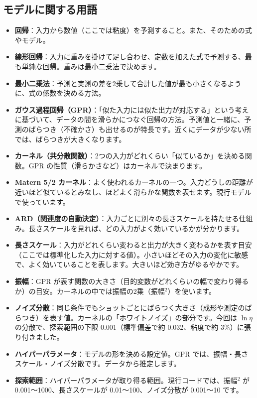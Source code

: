 \documentclass[paper=a4paper,fontsize=10.5pt,line_length=44zw,number_of_lines=38]{jlreq}
\newenvironment{termlist}{\begin{itemize}[label=・,leftmargin=1\zw,labelwidth=1\zw,labelsep=0pt,itemsep=0.4ex,topsep=0.6ex,parsep=0pt]}{\end{itemize}}
\newcommand{\term}[1]{\item \textbf{#1}：}
\begin{document}
\subsection{モデルに関する用語}
\begin{termlist}
\term{回帰}入力から数値（ここでは粘度）を予測すること。また、そのための式やモデル。
\term{線形回帰}入力に重みを掛けて足し合わせ、定数を加えた式で予測する、最も単純な回帰。重みは最小二乗法で決めます。
\term{最小二乗法}予測と実測の差を2乗して合計した値が最も小さくなるように、式の係数を決める方法。
\term{ガウス過程回帰（GPR）}「似た入力には似た出力が対応する」という考えに基づいて、データの間を滑らかにつなぐ回帰の方法。予測値と一緒に、予測のばらつき（不確かさ）も出せるのが特長です。近くにデータが少ない所では、ばらつきが大きくなります。
\term{カーネル（共分散関数）}2つの入力がどれくらい「似ているか」を決める関数。GPR の性質（滑らかさなど）はカーネルで決まります。
\term{Matern 5/2 カーネル}よく使われるカーネルの一つ。入力どうしの距離が近いほど似ているとみなし、ほどよく滑らかな関数を表せます。現行モデルで使っています。
\term{ARD（関連度の自動決定）}入力ごとに別々の長さスケールを持たせる仕組み。長さスケールを見れば、どの入力がよく効いているかが分かります。
\term{長さスケール}入力がどれくらい変わると出力が大きく変わるかを表す目安（ここでは標準化した入力に対する値）。小さいほどその入力の変化に敏感で、よく効いていることを表します。大きいほど効き方がゆるやかです。
\term{振幅}GPR が表す関数の大きさ（目的変数がどれくらいの幅で変わり得るか）の目安。カーネルの中では振幅の2乗（振幅$^2$）を使います。
\term{ノイズ分散}同じ条件でもショットごとにばらつく大きさ（成形や測定のばらつき）を表す値。カーネルの「ホワイトノイズ」の部分です。今回は $\ln\eta$ の分散で、探索範囲の下限 0.001（標準偏差で約 0.032、粘度で約 3\%）に張り付きました。
\term{ハイパーパラメータ}モデルの形を決める設定値。GPR では、振幅・長さスケール・ノイズ分散です。データから推定します。
\term{探索範囲}ハイパーパラメータが取り得る範囲。現行コードでは、振幅$^2$ が 0.001〜1000、長さスケールが 0.01〜100、ノイズ分散が 0.001〜10 です。
\end{termlist}
\end{document}
